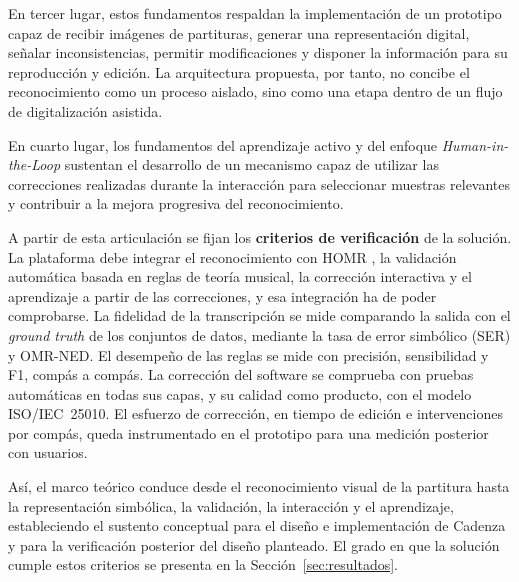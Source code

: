 \documentclass[conference]{IEEEtran}
\begin{document}
En tercer lugar, estos fundamentos respaldan la implementación de un
prototipo capaz de recibir imágenes de partituras, generar una
representación digital, señalar inconsistencias, permitir modificaciones y
disponer la información para su reproducción y edición. La arquitectura
propuesta, por tanto, no concibe el reconocimiento como un proceso aislado,
sino como una etapa dentro de un flujo de digitalización asistida.

En cuarto lugar, los fundamentos del aprendizaje activo y del enfoque
\textit{Human-in-the-Loop} sustentan el desarrollo de un mecanismo capaz de
utilizar las correcciones realizadas durante la interacción para seleccionar
muestras relevantes y contribuir a la mejora progresiva del reconocimiento.

A partir de esta articulación se fijan los \textbf{criterios de
verificación} de la solución. La plataforma debe integrar el
reconocimiento con HOMR \cite{homr2024}, la validación automática basada en
reglas de teoría musical, la corrección interactiva y el aprendizaje a
partir de las correcciones, y esa integración ha de poder comprobarse. La
fidelidad de la transcripción se mide comparando la salida con el
\textit{ground truth} de los conjuntos de datos, mediante la tasa de error
simbólico (SER) y OMR-NED. El desempeño de las reglas se mide con
precisión, sensibilidad y F1, compás a compás. La corrección del software
se comprueba con pruebas automáticas en todas sus capas, y su calidad como
producto, con el modelo ISO/IEC~25010. El esfuerzo de corrección, en tiempo
de edición e intervenciones por compás, queda instrumentado en el
prototipo para una medición posterior con usuarios.

Así, el marco teórico conduce desde el reconocimiento visual de la partitura
hasta la representación simbólica, la validación, la interacción y el
aprendizaje, estableciendo el sustento conceptual para el diseño e
implementación de Cadenza y para la verificación posterior del diseño
planteado. El grado en que la solución cumple estos criterios se presenta
en la Sección~\ref{sec:resultados}.


\end{document}
